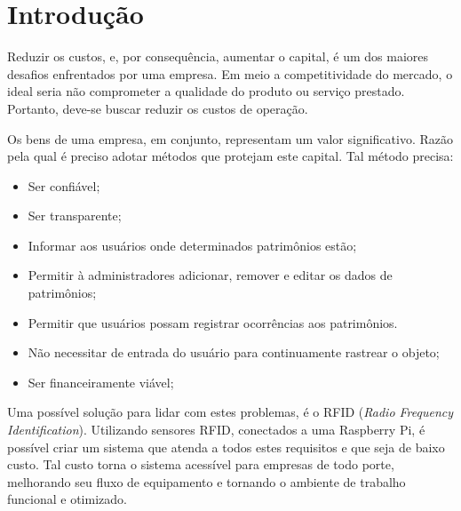 \documentclass[
	12pt,				%
	openright,			%
	oneside,			%
	a4paper,			%
	english,			%
	french,				%
	spanish,			%
	brazil				%
	]{abntex2}
\begin{document}

\tableofcontents*
\cleardoublepage



\textual

\chapter{Introdução}

Reduzir os custos, e, por consequência, aumentar o capital, é um dos maiores desafios enfrentados por uma empresa. Em meio a competitividade do mercado, o ideal seria não comprometer a qualidade do produto ou serviço prestado. Portanto, deve-se buscar reduzir os custos de operação.\cite{copastur2016}


Os bens de uma empresa, em conjunto, representam um valor significativo. Razão pela qual é preciso adotar métodos que protejam este capital. Tal método precisa:

\begin{itemize}
	\item Ser confiável;
	\item Ser transparente;
	\item Informar aos usuários onde determinados patrimônios estão;
	\item Permitir à administradores adicionar, remover e editar os dados de patrimônios;
	\item Permitir que usuários possam registrar ocorrências aos patrimônios.
	\item Não necessitar de entrada do usuário para continuamente rastrear o objeto;
	\item Ser financeiramente viável;
\end{itemize}

Uma possível solução para lidar com estes problemas, é o RFID (\emph{Radio Frequency Identification}).\cite{narcisoRFID} Utilizando sensores RFID, conectados a uma Raspberry Pi, é possível criar um sistema que atenda a todos estes requisitos e que seja de baixo custo. Tal custo torna o sistema acessível para empresas de todo porte, melhorando seu fluxo de equipamento e tornando o ambiente de trabalho funcional e otimizado.
\end{document}
